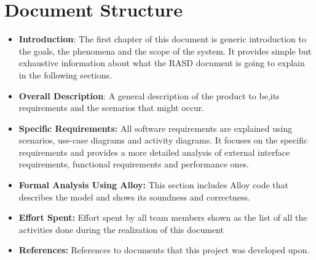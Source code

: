 \section{Document Structure}
\label{sec:document_structure}%
\begin{itemize}
    \item \textbf{Introduction}: The first chapter of this document is generic introduction to the goals, the phenomena and the scope of the system. It provides simple but exhaustive information about what the RASD document is going to explain in the following sections.
    \item \textbf{Overall Description}: A general description of the product to be,its requirements and the scenarios that might occur.
    \item \textbf{Specific Requirements:} All software requirements are explained using scenarios,
            use-case diagrams and activity diagrams. It focuses on the specific requirements and provides a more
            detailed analysis of external interface requirements, functional requirements and performance ones.
    \item \textbf{Formal Analysis Using Alloy:} This section includes Alloy code that describes the
            model and shows its soundness and correctness.
    \item \textbf{Effort Spent:} Effort spent by all team members shown as the list of all the activities
            done during the realization of this document
    \item \textbf{References:} References to documents that this project was developed upon.
\end{itemize}
